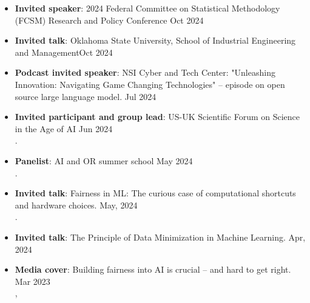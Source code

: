 
\vspace{6pt}
\begin{itemize}

  \item {\bf Invited speaker}: 
  {2024 Federal Committee on Statistical Methodology (FCSM) Research and Policy Conference} \hfill{Oct 2024}

  \item {\bf Invited talk}:
  {Oklahoma State University, School of Industrial Engineering and Management}\hfill {Oct 2024}

  \item {\bf Podcast invited speaker}: 
  NSI Cyber and Tech Center: "Unleashing Innovation: Navigating Game Changing Technologies" -- episode on open source large language model.
  \hfill{Jul 2024}\\

  \item {\bf Invited participant and group lead}: 
  {US-UK Scientific Forum on Science in the Age of AI} \hfill{Jun 2024}\\
  .

  \item {\bf Panelist}: {AI and OR summer school} \hfill{May 2024}\\
  .

  \item {\bf Invited talk}: Fairness in ML: The curious case of computational shortcuts and hardware choices. \hfill{May, 2024}\\
  .

  \item {\bf Invited talk}: The Principle of Data Minimization in Machine Learning. \hfill{Apr, 2024}\\
  {}

  \item {\bf Media cover}: 
  {Building fairness into AI is crucial – and hard to get right.} \hfill {Mar 2023} \\
  , 


\end{itemize}
